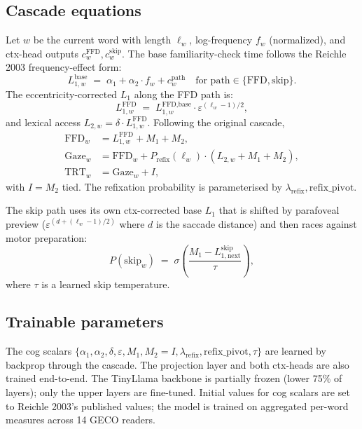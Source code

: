 \documentclass[11pt]{article}
\begin{document}
\subsection{Cascade equations}\label{sec:cascade}

Let $w$ be the current word with length $\ell_w$, log-frequency $f_w$ (normalized), and ctx-head outputs $c^{\text{FFD}}_w, c^{\text{skip}}_w$. The base familiarity-check time follows the Reichle 2003 frequency-effect form:
\begin{equation}
L_{1,w}^{\text{base}} \;=\; \alpha_1 + \alpha_2 \cdot f_w + c^{\text{path}}_w
\quad\text{for } \text{path} \in \{\text{FFD}, \text{skip}\}.
\end{equation}
The eccentricity-corrected $L_1$ along the FFD path is:
\begin{equation}
L_{1,w}^{\text{FFD}} \;=\; L_{1,w}^{\text{FFD,base}} \cdot \varepsilon^{(\ell_w - 1)/2},
\end{equation}
and lexical access $L_{2,w} = \delta \cdot L_{1,w}^{\text{FFD}}$. Following the original cascade,
\begin{align}
\text{FFD}_w  &= L_{1,w}^{\text{FFD}} + M_1 + M_2, \\
\text{Gaze}_w &= \text{FFD}_w + P_{\text{refix}}(\ell_w) \cdot (L_{2,w} + M_1 + M_2), \\
\text{TRT}_w  &= \text{Gaze}_w + I,
\end{align}
with $I = M_2$ tied. The refixation probability is parameterised by $\lambda_{\text{refix}}, \mathrm{refix\_pivot}$.

The skip path uses its own ctx-corrected base $L_1$ that is shifted by parafoveal preview ($\varepsilon^{(d + (\ell_w-1)/2)}$ where $d$ is the saccade distance) and then races against motor preparation:
\begin{equation}
P(\text{skip}_w) \;=\; \sigma\!\left(\frac{M_1 - L_{1,\text{next}}^{\text{skip}}}{\tau}\right),
\end{equation}
where $\tau$ is a learned skip temperature.

\subsection{Trainable parameters}\label{sec:params}

The cog scalars $\{\alpha_1, \alpha_2, \delta, \varepsilon, M_1, M_2 = I, \lambda_{\text{refix}}, \mathrm{refix\_pivot}, \tau\}$ are learned by backprop through the cascade. The projection layer and both ctx-heads are also trained end-to-end. The TinyLlama backbone is partially frozen (lower 75\% of layers); only the upper layers are fine-tuned. Initial values for cog scalars are set to Reichle 2003's published values; the model is trained on aggregated per-word measures across 14 GECO readers.
\end{document}
